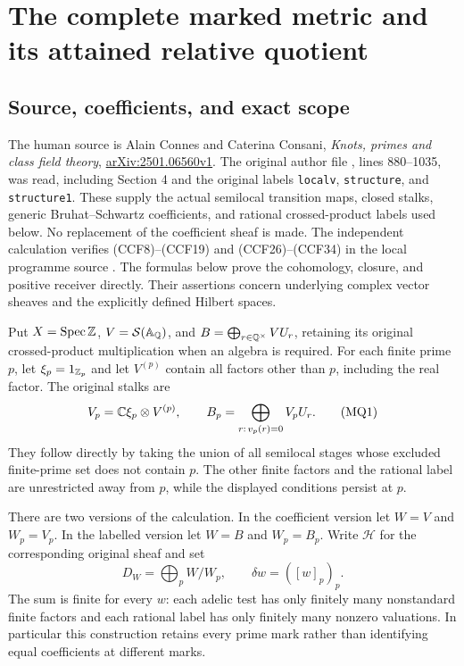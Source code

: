 \section{The complete marked metric and its attained relative quotient}


\subsection{Source, coefficients, and exact scope}

The human source is Alain Connes and Caterina Consani,
\emph{Knots, primes and class field theory},
\href{https://arxiv.org/abs/2501.06560v1}{arXiv:2501.06560v1}.
The original author file , lines 880--1035,
was read, including Section 4 and the original labels
\texttt{localv}, \texttt{structure}, and \texttt{structure1}.
These supply the actual semilocal transition maps, closed stalks,
generic Bruhat--Schwartz coefficients, and rational crossed-product
labels used below. No replacement of the coefficient sheaf is made.
The independent calculation verifies (CCF8)--(CCF19) and
(CCF26)--(CCF34) in the local programme source
.
The formulas below prove the cohomology, closure, and positive
receiver directly. Their assertions concern underlying complex
vector sheaves and the explicitly defined Hilbert spaces.

Put $X=\operatorname{Spec}\mathbb Z$, $V=\mathcal S(\mathbb A_\mathbb Q)$, and
$B=\bigoplus_{r\in\mathbb Q^\times}VU_r$, retaining its original
crossed-product multiplication when an algebra is required.
For each finite prime $p$, let $\xi_p=1_{\mathbb Z_p}$ and let
$V^{(p)}$ contain all factors other than $p$, including the real
factor. The original stalks are
\[
 V_p=\mathbb C\xi_p\otimes V^{(p)},\qquad
 B_p=\bigoplus_{r:\,v_p(r)=0}V_pU_r.
 \tag{MQ1}\label{mq:eq:stalks}
\]
They follow directly by taking the union of all semilocal stages
whose excluded finite-prime set does not contain $p$. The other
finite factors and the rational label are unrestricted away from
$p$, while the displayed conditions persist at $p$.

There are two versions of the calculation. In the coefficient
version let $W=V$ and $W_p=V_p$. In the labelled version let
$W=B$ and $W_p=B_p$. Write $\mathcal H$ for the corresponding
original sheaf and set
\[
 D_W=\bigoplus_p W/W_p,\qquad
 \delta w=([w]_p)_p.
 \tag{MQ2}\label{mq:eq:marked}
\]
The sum is finite for every $w$: each adelic test has only finitely
many nonstandard finite factors and each rational label has only
finitely many nonzero valuations. In particular this construction
retains every prime mark rather than identifying equal coefficients
at different marks.

